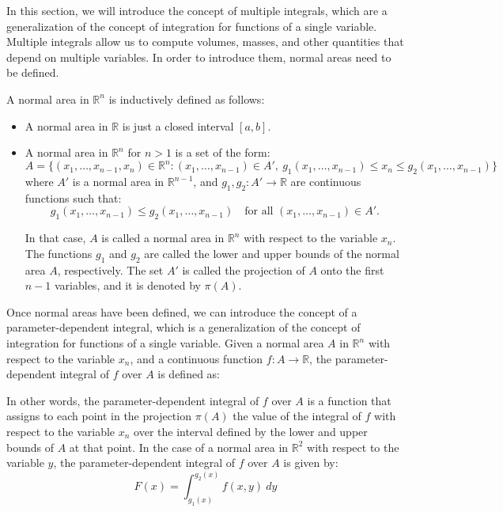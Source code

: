 In this section, we will introduce the concept of multiple integrals, which are a generalization of the concept of integration for functions of a single variable. Multiple integrals allow us to compute volumes, masses, and other quantities that depend on multiple variables. In order to introduce them, normal areas need to be defined.
\begin{definicion}
    A normal area in $\mathbb{R}^n$ is inductively defined as follows:
    \begin{itemize}
        \item A normal area in $\mathbb{R}$ is just a closed interval $[a, b]$.
        \item A normal area in $\mathbb{R}^n$ for $n > 1$ is a set of the form:
        \[
            A = \{(x_1,\dots,x_{n-1},x_n) \in \mathbb{R}^n : (x_1,\dots,x_{n-1}) \in A',\ g_1(x_1,\dots,x_{n-1}) \leq x_n \leq g_2(x_1,\dots,x_{n-1})\}
        \]
        where $A'$ is a normal area in $\mathbb{R}^{n-1}$, and $g_1, g_2 : A' \to \mathbb{R}$ are continuous functions such that:
        \[
            g_1(x_1,\dots,x_{n-1}) \leq g_2(x_1,\dots,x_{n-1}) \quad \text{for all } (x_1,\dots,x_{n-1}) \in A'.
        \]

        In that case, $A$ is called a normal area in $\mathbb{R}^n$ with respect to the variable $x_n$. The functions $g_1$ and $g_2$ are called the lower and upper bounds of the normal area $A$, respectively. The set $A'$ is called the projection of $A$ onto the first $n-1$ variables, and it is denoted by $\pi(A)$.
    \end{itemize}
\end{definicion}

Once normal areas have been defined, we can introduce the concept of a parameter-dependent integral, which is a generalization of the concept of integration for functions of a single variable. Given a normal area $A$ in $\mathbb{R}^n$ with respect to the variable $x_n$, and a continuous function $f : A \to \mathbb{R}$, the parameter-dependent integral of $f$ over $A$ is defined as:

In other words, the parameter-dependent integral of $f$ over $A$ is a function that assigns to each point in the projection $\pi(A)$ the value of the integral of $f$ with respect to the variable $x_n$ over the interval defined by the lower and upper bounds of $A$ at that point. In the case of a normal area in $\mathbb{R}^2$ with respect to the variable $y$, the parameter-dependent integral of $f$ over $A$ is given by:
\[
    F(x) = \int_{g_1(x)}^{g_2(x)} f(x,y)\ dy
\]

